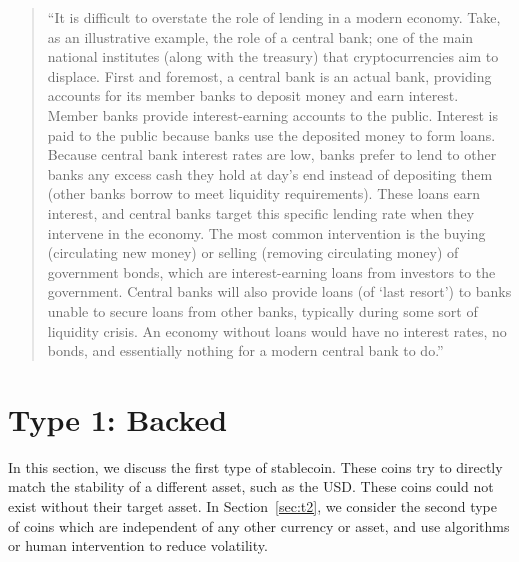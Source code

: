 \begin{quote}

``It is difficult to overstate the role of lending in a modern economy. Take, as an illustrative example, the role of a central bank; one of the main national institutes (along with the treasury) that cryptocurrencies aim to displace. First and foremost, a central bank is an actual bank, providing accounts for its member banks to deposit money and earn interest. Member banks provide interest-earning accounts to the public. Interest is paid to the public because banks use the deposited money to form loans. Because central bank interest rates are low, banks prefer to lend to other banks any excess cash they hold at day's end instead of depositing them (other banks borrow to meet liquidity requirements). These loans earn interest, and central banks target this specific lending rate when they intervene in the economy. The most common intervention is the buying (circulating new money) or selling (removing circulating money) of government bonds, which are interest-earning loans from investors to the government. Central banks will also provide loans (of `last resort') to banks unable to secure loans from other banks, typically during some sort of liquidity crisis. An economy without loans would have no interest rates, no bonds, and essentially nothing for a modern central bank to do.''

\end{quote}




\section{Type 1: Backed}
\label{sec:t1}

In this section, we discuss the first type of stablecoin. These coins try to directly match the stability of a different asset, such as the USD. These coins could not exist without their target asset.  In Section~\ref{sec:t2}, we consider the second type of coins which are independent of any other currency or asset, and use algorithms or human intervention to reduce volatility.



